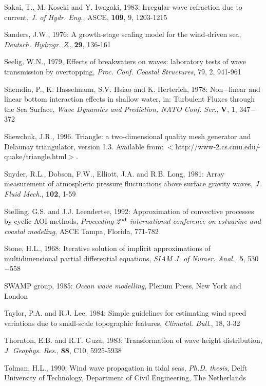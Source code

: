 \documentclass[12pt]{book}
\begin{document}
\begin{thebibliography}{10}
Sakai, T., M. Koseki and Y. Iwagaki, 1983: Irregular wave refraction due to current, {\it J. of Hydr. Eng.}, ASCE,
{\bf 109}, 9, 1203-1215

Sanders, J.W., 1976: A growth-stage scaling model for the wind-driven sea, {\it Deutsch. Hydrogr. Z}., {\bf 29}, 136-161

Seelig, W.N., 1979, Effects of breakwaters on waves: laboratory tests of wave transmission by
overtopping, {\it Proc. Conf. Coastal Structures}, 79, 2, 941-961

Shemdin, P., K. Hasselmann, S.V. Hsiao and K. Herterich, 1978: Non$-$linear and linear  bottom interaction
effects in shallow water, in: Turbulent Fluxes through the Sea Surface, {\it Wave Dynamics and
Prediction, NATO Conf. Ser}., {\bf V}, 1, 347$-$372

Shewchuk, J.R., 1996.
Triangle: a two-dimensional quality mesh generator and Delaunay triangulator, version 1.3.
Available from: $<$http://www-2.cs.cmu.edu/$\,\tilde{}\,$quake/triangle.html$>$.

Snyder, R.L., Dobson, F.W., Elliott, J.A. and R.B. Long, 1981: Array measurement of atmospheric pressure
fluctuations above surface gravity waves, {\it J. Fluid Mech}., {\bf 102}, 1-59

Stelling, G.S. and J.J. Leendertse, 1992: Approximation of convective processes by cyclic AOI methods,
{\it Proceeding 2$^{{\rm nd}}$ international conference on estuarine and coastal modeling}, ASCE Tampa,
Florida, 771-782

Stone, H.L., 1968: Iterative solution of implicit approximations of multidimensional partial differential
equations, {\it SIAM J. of Numer. Anal.}, {\bf 5}, 530$-$558

SWAMP group, 1985: {\it Ocean wave modelling}, Plenum Press, New York and London

Taylor, P.A. and R.J. Lee, 1984: Simple guidelines for estimating wind speed variations due to small-scale
topographic features, {\it Climatol. Bull}., 18, 3-32

Thornton, E.B. and R.T. Guza, 1983: Transformation of wave height distribution, {\it J. Geophys. Res}., {\bf 88},
C10, 5925-5938

Tolman, H.L., 1990: Wind wave propagation in tidal seas, {\it Ph.D. thesis}, Delft University of Technology,
Department of Civil Engineering, The Netherlands


\end{thebibliography}
\end{document}
